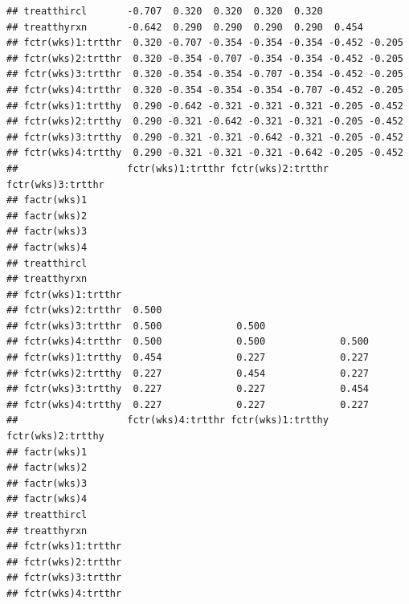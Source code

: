 \documentclass{article}\usepackage[]{graphicx}\usepackage[]{color}
\makeatletter
\newenvironment{kframe}{%
 \def\at@end@of@kframe{}%
 \ifinner\ifhmode%
  \def\at@end@of@kframe{\end{minipage}}%
  \begin{minipage}{\columnwidth}%
 \fi\fi%
 \def\FrameCommand##1{\hskip\@totalleftmargin \hskip-\fboxsep
 \colorbox{shadecolor}{##1}\hskip-\fboxsep
     \hskip-\linewidth \hskip-\@totalleftmargin \hskip\columnwidth}%
 \MakeFramed {\advance\hsize-\width
   \@totalleftmargin\z@ \linewidth\hsize
   \@setminipage}}%
 {\par\unskip\endMakeFramed%
 \at@end@of@kframe}
\newenvironment{knitrout}{}{} %
\makeatother
\begin{document}
\begin{enumerate}[(a)]
\begin{knitrout}
\begin{kframe}
\begin{verbatim}
## treatthircl       -0.707  0.320  0.320  0.320  0.320              
## treatthyrxn       -0.642  0.290  0.290  0.290  0.290  0.454       
## fctr(wks)1:trtthr  0.320 -0.707 -0.354 -0.354 -0.354 -0.452 -0.205
## fctr(wks)2:trtthr  0.320 -0.354 -0.707 -0.354 -0.354 -0.452 -0.205
## fctr(wks)3:trtthr  0.320 -0.354 -0.354 -0.707 -0.354 -0.452 -0.205
## fctr(wks)4:trtthr  0.320 -0.354 -0.354 -0.354 -0.707 -0.452 -0.205
## fctr(wks)1:trtthy  0.290 -0.642 -0.321 -0.321 -0.321 -0.205 -0.452
## fctr(wks)2:trtthy  0.290 -0.321 -0.642 -0.321 -0.321 -0.205 -0.452
## fctr(wks)3:trtthy  0.290 -0.321 -0.321 -0.642 -0.321 -0.205 -0.452
## fctr(wks)4:trtthy  0.290 -0.321 -0.321 -0.321 -0.642 -0.205 -0.452
##                   fctr(wks)1:trtthr fctr(wks)2:trtthr fctr(wks)3:trtthr
## factr(wks)1                                                            
## factr(wks)2                                                            
## factr(wks)3                                                            
## factr(wks)4                                                            
## treatthircl                                                            
## treatthyrxn                                                            
## fctr(wks)1:trtthr                                                      
## fctr(wks)2:trtthr  0.500                                               
## fctr(wks)3:trtthr  0.500             0.500                             
## fctr(wks)4:trtthr  0.500             0.500             0.500           
## fctr(wks)1:trtthy  0.454             0.227             0.227           
## fctr(wks)2:trtthy  0.227             0.454             0.227           
## fctr(wks)3:trtthy  0.227             0.227             0.454           
## fctr(wks)4:trtthy  0.227             0.227             0.227           
##                   fctr(wks)4:trtthr fctr(wks)1:trtthy fctr(wks)2:trtthy
## factr(wks)1                                                            
## factr(wks)2                                                            
## factr(wks)3                                                            
## factr(wks)4                                                            
## treatthircl                                                            
## treatthyrxn                                                            
## fctr(wks)1:trtthr                                                      
## fctr(wks)2:trtthr                                                      
## fctr(wks)3:trtthr                                                      
## fctr(wks)4:trtthr                                                      

\end{verbatim}
\end{kframe}
\end{knitrout}
\end{enumerate}
\end{document}
